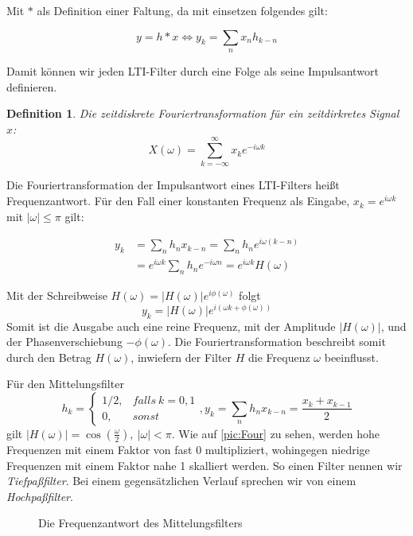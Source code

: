 \documentclass[]{scrartcl}
\theoremstyle{plain}
\newtheorem{defn}[theo]{Definition}
\theoremstyle{remark}
\begin{document}
    Mit $*$ als Definition einer Faltung, da mit einsetzen folgendes gilt:

    $$y = h*x \Leftrightarrow y_k = \sum_n x_n h_{k-n}$$

    Damit können wir jeden LTI-Filter durch eine Folge als seine Impulsantwort definieren.

    \begin{defn}
        Die zeitdiskrete Fouriertransformation für ein zeitdirkretes Signal $x$:
        $$X(\omega) = \sum_{k=-\infty}^{\infty}x_k e^{-i\omega k}$$
    \end{defn}

    Die Fouriertransformation der Impulsantwort eines LTI-Filters heißt Frequenzantwort. 
    Für den Fall einer konstanten Frequenz als Eingabe, $x_k = e^{i \omega k}$ mit $|\omega| \le \pi$ gilt:

    \begin{align*}
        y_k &= \sum_n h_n x_{k-n} = \sum_n h_n e^{i \omega (k - n)} \\
        &= e^{i \omega k} \sum_n h_n e^{-i \omega n} = e^{i \omega k} H(\omega)
    \end{align*}

    Mit der Schreibweise $H(\omega) = |H(\omega)|e^{i \phi(\omega)}$ folgt
    $$y_k = |H(\omega)|e^{i(\omega k + \phi(\omega))}$$
    Somit ist die Ausgabe auch eine reine Frequenz, mit der Amplitude $|H(\omega)|$, und der Phasenverschiebung $-\phi(\omega)$. Die Fouriertransformation beschreibt somit durch den Betrag $H(\omega)$, inwiefern der Filter $H$ die Frequenz $\omega$ beeinflusst.

    Für den Mittelungsfilter
    $$h_k =
    \begin{cases}
        1/2, &falls \: k=0,1 \\
        0, &sonst
    \end{cases},
    y_k = \sum_n h_n x_{k-n} = \frac{x_k + x_{k-1}}{2}
    $$
    gilt $|H(\omega)| = \cos(\frac{\omega}{2}), \: |\omega| < \pi$. Wie auf \autoref{pic:Four} zu sehen, werden hohe Frequenzen mit einem Faktor von fast 0 multipliziert, wohingegen niedrige Frequenzen mit einem Faktor nahe 1 skalliert werden. So einen Filter nennen wir \emph{Tiefpaßfilter}. Bei einem gegensätzlichen Verlauf sprechen wir von einem \emph{Hochpaßfilter}.
    
    \begin{figure}
        \centering
    \caption{Die Frequenzantwort des Mittelungsfilters \label{pic:Four}}
    \end{figure}
\end{document}
